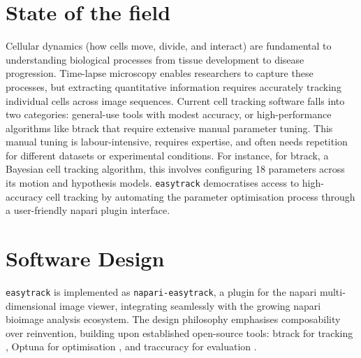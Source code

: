 \documentclass[11pt]{article}
\begin{document}
\section*{State of the field}
Cellular dynamics (how cells move, divide, and interact) are fundamental to understanding biological processes from 
tissue development to disease progression. Time-lapse microscopy enables researchers to capture these processes, but 
extracting quantitative information requires accurately tracking individual cells across image sequences. Current cell 
tracking software falls into two categories: general-use tools with modest accuracy, or high-performance algorithms like 
btrack \cite{btrack:2017, btrack:2021} that require extensive manual parameter tuning. This manual tuning is 
labour-intensive, requires expertise, and often needs repetition for different datasets or experimental conditions. 
For instance, for btrack, a Bayesian cell tracking algorithm, this involves configuring 18 parameters across its motion 
and hypothesis models. 
\texttt{easytrack} democratises access to high-accuracy cell tracking by automating the parameter optimisation process through 
a user-friendly napari plugin interface.

\section*{Software Design}
\texttt{easytrack} is implemented as \texttt{napari-easytrack}, a plugin for the napari multi-dimensional image viewer, integrating 
seamlessly with the growing napari bioimage analysis ecosystem. The design philosophy emphasises composability over 
reinvention, building upon established open-source tools: btrack for tracking \cite{btrack:2017, btrack:2021}, Optuna for 
optimisation \cite{Optuna:2019}, and traccuracy for evaluation \cite{Traccuracy:2023}.
\end{document}
